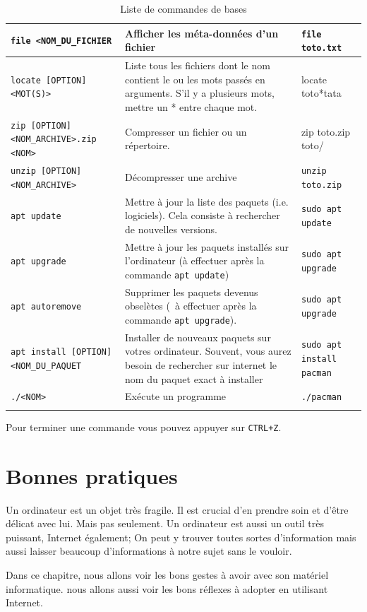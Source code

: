 \documentclass[12pt]{book}
\begin{document}
\begin{longtable}{|p{}|p{}|p{}|}
		\texttt{file <NOM\_DU\_FICHIER} & Afficher les méta-données d'un fichier & \texttt{file toto.txt}\\\hline
		\texttt{locate [OPTION] <MOT(S)>} & Liste tous les fichiers dont le nom contient le ou les mots passés en arguments. S'il y a plusieurs mots, mettre un * entre chaque mot. & locate toto*tata\\\hline
		\texttt{zip [OPTION] <NOM\_ARCHIVE>.zip <NOM>} & Compresser un fichier ou un répertoire. & zip toto.zip toto/\\\hline
		\texttt{unzip [OPTION] <NOM\_ARCHIVE>} & Décompresser une archive & \texttt{unzip toto.zip}\\\hline
		\texttt{apt update} & Mettre à jour la liste des paquets (i.e. logiciels). Cela consiste à rechercher de nouvelles versions. & \texttt{sudo apt update}\\\hline
		\texttt{apt upgrade} & Mettre à jour les paquets  installés sur l'ordinateur (à effectuer après la commande \texttt{apt update}) & \texttt{sudo apt upgrade}\\\hline
		\texttt{apt autoremove} & Supprimer les paquets devenus obselètes (\ à effectuer après la commande \texttt{apt upgrade}). & \texttt{sudo apt upgrade}\\\hline
		\texttt{apt install [OPTION] <NOM\_DU\_PAQUET} & Installer de nouveaux paquets sur votres ordinateur. Souvent, vous aurez besoin de rechercher sur internet le nom du paquet exact à installer & \texttt{sudo apt install pacman}\\\hline
		\texttt{./<NOM>} & Exécute un programme & \texttt{./pacman}\\\hline
	\caption{Liste de commandes de bases}
	\label{tab:commande}
	\end{longtable}\par
	Pour terminer une commande vous pouvez appuyer sur \texttt{CTRL+Z}.

\chapter{Bonnes pratiques}
	Un ordinateur est un objet très fragile. 
	Il est crucial d'en prendre soin et d'être délicat avec lui.
	Mais pas seulement. 
	Un ordinateur est aussi un outil très puissant, Internet également;
	On peut y trouver toutes sortes d'information mais aussi laisser beaucoup d'informations à notre sujet sans le vouloir.\par
	Dans ce chapitre, nous allons voir les bons gestes à avoir avec son matériel informatique.
	nous allons aussi voir les bons réflexes à adopter en utilisant Internet.
\end{document}
